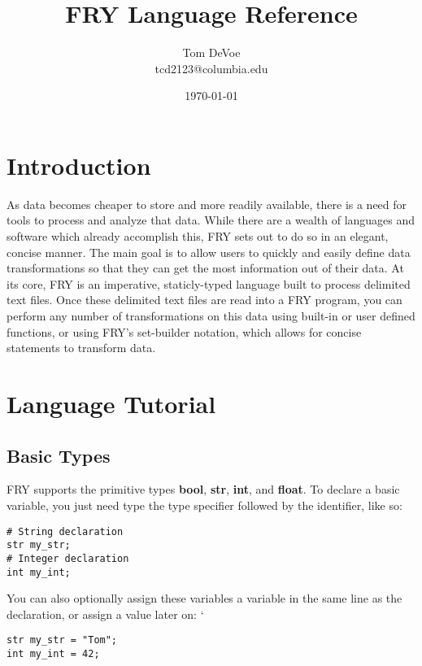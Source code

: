 \documentclass{article}
\title{FRY Language Reference}
\author{Tom DeVoe \\ tcd2123@columbia.edu}
\date{\today}
\begin{document}
\maketitle
\tableofcontents 
{}
\section{Introduction}
As data becomes cheaper to store and more readily available, there is a need for tools to process and analyze that data. While there are a wealth of languages and software which already accomplish this, FRY sets out to do so in an elegant, concise manner. The main goal is to allow users to quickly and easily define data transformations so that they can get the most information out of their data.
At its core, FRY is an imperative, staticly-typed language built to process delimited text files. Once these delimited text files are read into a FRY program, you can perform any number of transformations on this data using built-in or user defined functions, or using FRY's set-builder notation, which allows for concise statements to transform data. 

\section{Language Tutorial}
\subsection{Basic Types}
FRY supports the primitive types \textbf{bool}, \textbf{str}, \textbf{int}, and \textbf{float}. To declare a basic variable, you just need type the type specifier followed by the identifier, like so:

\begin{lstlisting}
# String declaration
str my_str;
# Integer declaration 
int my_int;
\end{lstlisting}

You can also optionally assign these variables a variable in the same line as the declaration, or assign a value later on:
`
\begin{lstlisting}
str my_str = "Tom";
int my_int = 42;
\end{lstlisting}
\end{document}
